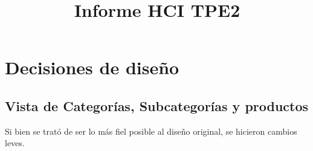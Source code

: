 \documentclass[english]{article}
\begin{document}
\title{Informe HCI TPE2}

\maketitle

\section{Decisiones de diseño}


\subsection*{Vista de Categorías, Subcategorías y productos }

Si bien se trató de ser lo más fiel posible al diseño original, se
hicieron cambios leves.
\end{document}
